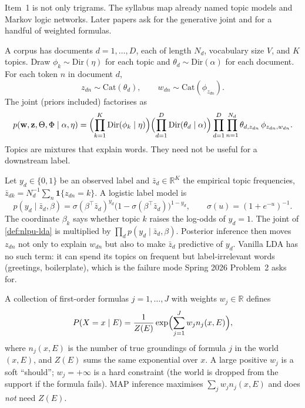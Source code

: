 Item~1 is not only trigrams. The syllabus map already named topic models and Markov logic networks. Later papers ask for the generative joint and for a handful of weighted formulas.

\begin{definition}
\label{def:nlpu-lda}
A corpus has documents $d=1,\dots,D$, each of length $N_d$, vocabulary size $V$, and $K$ topics. Draw $\phi_k\sim\mathrm{Dir}(\eta)$ for each topic and $\theta_d\sim\mathrm{Dir}(\alpha)$ for each document. For each token $n$ in document $d$,
\[
z_{dn}\sim\mathrm{Cat}(\theta_d),
\qquad
w_{dn}\sim\mathrm{Cat}(\phi_{z_{dn}}).
\]
The joint (priors included) factorises as
\[
p(\mathbf{w},\mathbf{z},\Theta,\Phi\mid\alpha,\eta)
=
\Bigl(\prod_{k=1}^K\mathrm{Dir}(\phi_k\mid\eta)\Bigr)
\Bigl(\prod_{d=1}^D\mathrm{Dir}(\theta_d\mid\alpha)\Bigr)
\prod_{d=1}^D\prod_{n=1}^{N_d}
\theta_{d,z_{dn}}\,\phi_{z_{dn},w_{dn}}.
\]
Topics are mixtures that explain words. They need not be useful for a downstream label.
\end{definition}

\begin{proposition}
\label{prop:nlpu-slda}
Let $y_d\in\{0,1\}$ be an observed label and $\bar z_d\in\mathbb{R}^K$ the empirical topic frequencies, $\bar z_{dk}=N_d^{-1}\sum_n\mathbf{1}\{z_{dn}=k\}$. A logistic label model is
\[
p(y_d\mid\bar z_d,\beta)
=
\sigma(\beta^\top\bar z_d)^{y_d}
\bigl(1-\sigma(\beta^\top\bar z_d)\bigr)^{1-y_d},
\qquad
\sigma(u)=(1+e^{-u})^{-1}.
\]
The coordinate $\beta_k$ says whether topic $k$ raises the log-odds of $y_d=1$. The joint of \cref{def:nlpu-lda} is multiplied by $\prod_d p(y_d\mid\bar z_d,\beta)$. Posterior inference then moves $z_{dn}$ not only to explain $w_{dn}$ but also to make $\bar z_d$ predictive of $y_d$. Vanilla LDA has no such term: it can spend its topics on frequent but label-irrelevant words (greetings, boilerplate), which is the failure mode Spring 2026 Problem~2 asks for.
\end{proposition}

\begin{definition}
\label{def:nlpu-mln}
A collection of first-order formulas $j=1,\dots,J$ with weights $w_j\in\mathbb{R}$ defines
\[
P(X=x\mid E)
=
\frac1{Z(E)}
\exp\Bigl(\sum_{j=1}^J w_j n_j(x,E)\Bigr),
\]
where $n_j(x,E)$ is the number of true groundings of formula $j$ in the world $(x,E)$, and $Z(E)$ sums the same exponential over $x$. A large positive $w_j$ is a soft ``should''; $w_j=+\infty$ is a hard constraint (the world is dropped from the support if the formula fails). MAP inference maximises $\sum_j w_j n_j(x,E)$ and does \emph{not} need $Z(E)$.
\end{definition}

